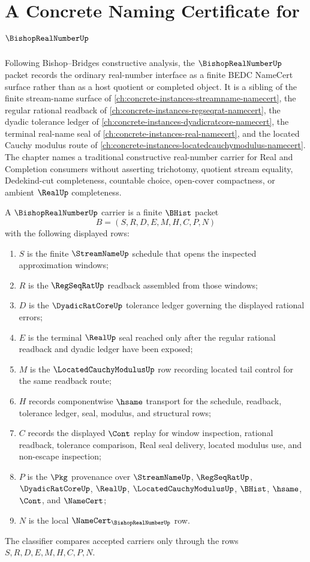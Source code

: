 \chapter{A Concrete Naming Certificate for $\BishopRealNumberUp$}
\label{ch:concrete-instances-bishop-real-number-namecert}

Following Bishop--Bridges constructive analysis, the $\BishopRealNumberUp$ packet records the ordinary real-number interface as a finite BEDC NameCert surface rather than as a host quotient or completed object. It is a sibling of the finite stream-name surface of \autoref{ch:concrete-instances-streamname-namecert}, the regular rational readback of \autoref{ch:concrete-instances-regseqrat-namecert}, the dyadic tolerance ledger of \autoref{ch:concrete-instances-dyadicratcore-namecert}, the terminal real-name seal of \autoref{ch:concrete-instances-real-namecert}, and the located Cauchy modulus route of \autoref{ch:concrete-instances-locatedcauchymodulus-namecert}. The chapter names a traditional constructive real-number carrier for Real and Completion consumers without asserting trichotomy, quotient stream equality, Dedekind-cut completeness, countable choice, open-cover compactness, or ambient $\RealUp$ completeness.

\begin{definition}
\label{def:bishop-real-number-carrier}
A $\BishopRealNumberUp$ carrier is a finite $\BHist$ packet
$$
B=(S,R,D,E,M,H,C,P,N)
$$
with the following displayed rows:
\begin{enumerate}
\item $S$ is the finite $\StreamNameUp$ schedule that opens the inspected approximation windows;
\item $R$ is the $\RegSeqRatUp$ readback assembled from those windows;
\item $D$ is the $\DyadicRatCoreUp$ tolerance ledger governing the displayed rational errors;
\item $E$ is the terminal $\RealUp$ seal reached only after the regular rational readback and dyadic ledger have been exposed;
\item $M$ is the $\LocatedCauchyModulusUp$ row recording located tail control for the same readback route;
\item $H$ records componentwise $\hsame$ transport for the schedule, readback, tolerance ledger, seal, modulus, and structural rows;
\item $C$ records the displayed $\Cont$ replay for window inspection, rational readback, tolerance comparison, Real seal delivery, located modulus use, and non-escape inspection;
\item $P$ is the $\Pkg$ provenance over $\StreamNameUp$, $\RegSeqRatUp$, $\DyadicRatCoreUp$, $\RealUp$, $\LocatedCauchyModulusUp$, $\BHist$, $\hsame$, $\Cont$, and $\NameCert$;
\item $N$ is the local $\NameCert_{\BishopRealNumberUp}$ row.
\end{enumerate}
The classifier compares accepted carriers only through the rows $S,R,D,E,M,H,C,P,N$.
\end{definition}

